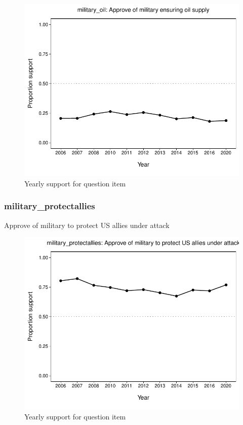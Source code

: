\documentclass[
  12pt]{article}
\begin{document}
\begin{figure}

{\centering \includegraphics{error-checking_files/figure-latex/unnamed-chunk-3-32} 

}

\caption{Yearly support for question item}\label{fig:unnamed-chunk-3-32}
\end{figure}

\hypertarget{military_protectallies}{%
\subsubsection{military\_protectallies}\label{military_protectallies}}

Approve of military to protect US allies under attack

\begin{figure}

{\centering \includegraphics{error-checking_files/figure-latex/unnamed-chunk-3-33} 

}

\caption{Yearly support for question item}\label{fig:unnamed-chunk-3-33}
\end{figure}
\end{document}
